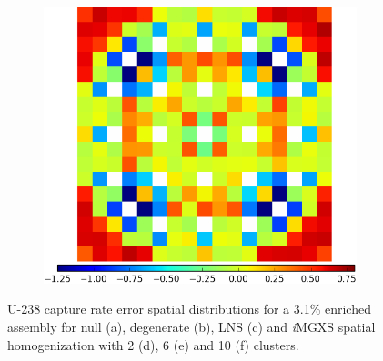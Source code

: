 \begin{figure}[h!]
\begin{subfigure}{0.45\textwidth}
  \caption{}
  \label{fig:chap11-assm-3.1-capt-pinch-6}
\end{subfigure}%
\begin{subfigure}{0.45\textwidth}
  \centering
  \includegraphics[width=\linewidth]{figures/results/assm-31/pca-transform/capt-err-pinch-agglomerative-(10)}
  \caption{}
  \label{fig:chap11-assm-3.1-capt-pinch-10}
\end{subfigure}
\vspace{2mm}
\caption[U-238 capture rate errors for a 3.1\% enriched assembly]{U-238 capture rate error spatial distributions for a 3.1\% enriched assembly for null (a), degenerate (b), \ac{LNS} (c) and \textit{i}\ac{MGXS} spatial homogenization with 2 (d), 6 (e) and 10 (f) clusters.}
\label{fig:chap11-assm-3.1-capt-rates}
\end{figure}

\clearpage

